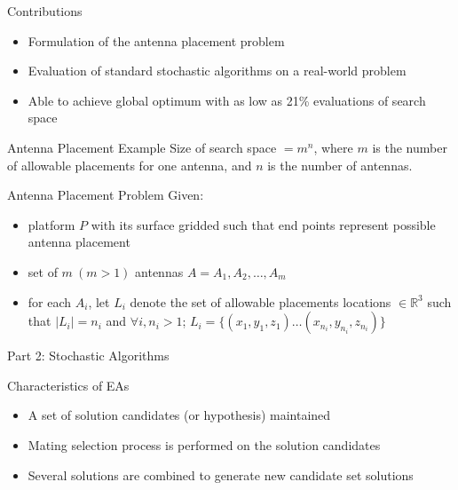 \documentclass{beamer}
\begin{document}
            \begin{frame}[t]{Contributions}
                \begin{itemize}
                    \item Formulation of the antenna placement problem
                    \item Evaluation of standard stochastic algorithms on a real-world problem
                    \item Able to achieve global optimum with as low as 21\% evaluations of search space
                \end{itemize}
                \vspace{5mm}
            \end{frame}


            \begin{frame}[t]{Antenna Placement Example}
                Size of search space $= m^n$, where $m$ is the number of allowable placements for one antenna, and $n$ is the number of antennas.
            \end{frame}

            \begin{frame}[t]{Antenna Placement Problem}
                Given:
            \begin{itemize} \itemsep1.5em
                    \item<1-> platform $P$ with its surface gridded such that end points represent possible antenna placement
                    \item<2-> set of  $m~(m > 1)$ antennas $A = {A_1, A_2, \dots, A_m}$
                    \item<3-> for each $A_i$, let $L_i$ denote the set of allowable placements locations $\in \mathbb R^3$ such that $\mid L_i \mid = n_i$ and $\forall i, n_i > 1$; $L_i = \{(x_{1}, y_{1}, z_{1}) \dots (x_{n_i}, y_{n_i}, z_{n_i})\}$
                \end{itemize}
                \vspace{10px}
                \centering{}
            \end{frame}

    \begin{frame}{\null}
        \begin{tcolorbox}[colback=green!5]
            \centering\Huge
            Part 2: Stochastic Algorithms
            \end{tcolorbox}
    \end{frame}
            \begin{frame}[t]{Characteristics of EAs}
            \begin{itemize} \itemsep1.5em
                    \item A set of solution candidates (or hypothesis) maintained
                    \item Mating selection process is performed on the solution candidates
                    \item Several solutions are combined to generate new candidate set solutions
                \end{itemize}
            \end{frame}
\end{document}
